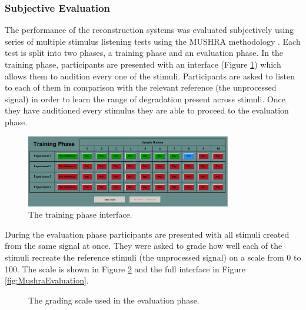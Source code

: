		\subsubsection*{Subjective Evaluation}
			The performance of the reconstruction systems was evaluated subjectively using series of multiple
			stimulus listening tests using the MUSHRA methodology \citep{mushra2014}. Each test is split into
			two phases, a training phase and an evaluation phase. In the training phase, participants are
			presented with an interface (Figure \ref{fig:MushraTraining}) which allows them to audition every
			one of the stimuli. Participants are asked to listen to each of them in comparison with the
			relevant reference (the unprocessed signal) in order to learn the range of degradation present
			across stimuli. Once they have auditioned every stimulus they are able to proceed to the evaluation
			phase.

			\begin{figure}[h!]
				\centering
				\includegraphics[width=0.8\textwidth]{chapter7/Images/MushraTraining.png}
				\caption{The training phase interface.}
				\label{fig:MushraTraining}
			\end{figure}

			During the evaluation phase participants are presented with all stimuli created from the same
			signal at once. They were asked to grade how well each of the stimuli recreate the reference
			stimuli (the unprocessed signal) on a scale from 0 to 100. The scale is shown in Figure
			\ref{fig:MushraScale} and the full interface in Figure \ref{fig:MushraEvaluation}.

			\begin{figure}[h!]
				\centering
				\caption{The grading scale used in the evaluation phase.}
				\label{fig:MushraScale}
			\end{figure}

